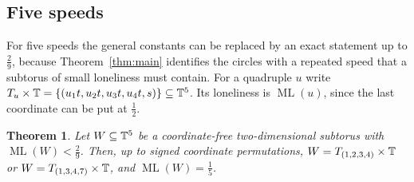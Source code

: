 \documentclass[12pt]{amsart}
\newtheorem{theorem}{Theorem}[section]
\theoremstyle{definition}\newtheorem{definition}[theorem]{Definition}
\theoremstyle{remark}\newtheorem{remark}[theorem]{Remark}
\newcommand{\ML}{\operatorname{ML}}
\begin{document}
\subsection{Five speeds}\label{sec:five}
For five speeds the general constants can be replaced by an exact statement up to $\frac29$, because Theorem~\ref{thm:main} identifies the circles with a repeated speed that a subtorus of small loneliness must contain. For a quadruple $u$ write $T_u\times\mathbb T=\{(u_1t,u_2t,u_3t,u_4t,s)\}\subseteq\mathbb T^5$. Its loneliness is $\ML(u)$, since the last coordinate can be put at $\frac12$.

\begin{theorem}\label{thm:five}
Let $W\subseteq\mathbb T^5$ be a coordinate-free two-dimensional subtorus with $\ML(W)<\frac29$. Then, up to signed coordinate permutations, $W=T_{(1,2,3,4)}\times\mathbb T$ or $W=T_{(1,3,4,7)}\times\mathbb T$, and $\ML(W)=\frac15$.
\end{theorem}
\end{document}
